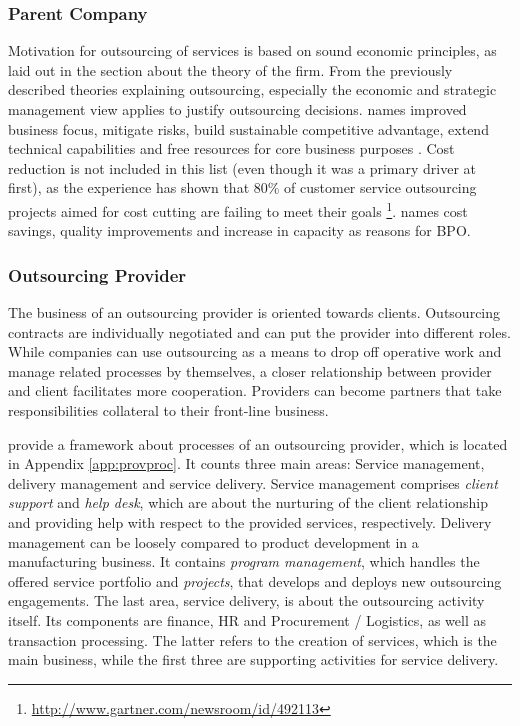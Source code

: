 		\subsubsection{Parent Company}
		Motivation for outsourcing of services is based on sound economic principles, as laid out in the section about the theory of the firm. From the previously described theories explaining outsourcing, especially the economic and strategic management view applies to justify outsourcing decisions. \citeauthor{bartell1998information} names improved business focus, mitigate risks, build sustainable competitive advantage, extend technical capabilities and free resources for core business purposes \citep{bartell1998information}. Cost reduction is not included in this list (even though it was a primary driver at first), as the experience has shown that 80\% of customer service outsourcing projects aimed for cost cutting are failing to meet their goals \footnote{\cf \url{http://www.gartner.com/newsroom/id/492113}}. \citeauthor{Gross2007} names cost savings, quality improvements and increase in capacity \citep[]{gross2007} as reasons for \acrshort{BPO}. 
	
		\subsubsection{Outsourcing Provider}
		
		The business of an outsourcing provider is oriented towards clients. Outsourcing contracts are individually negotiated and can put the provider into different roles. While companies can use outsourcing as a means to drop off operative work and manage related processes by themselves, a closer relationship between provider and client facilitates more cooperation. Providers can become partners that take responsibilities collateral to their front-line business. 
		
		\cite{schewe2007} provide a framework about processes of an outsourcing provider, which is located in Appendix \ref{app:provproc}. It counts three main areas: Service management, delivery management and service delivery. Service management comprises \textit{client support} and \textit{help desk}, which are about the nurturing of the client relationship and providing help with respect to the provided services, respectively. Delivery management can be loosely compared to product development in a manufacturing business. It contains \textit{program management}, which handles the offered service portfolio and \textit{projects}, that develops and deploys new outsourcing engagements. The last area, service delivery, is about the outsourcing activity itself. Its components are finance, HR and Procurement / Logistics, as well as transaction processing. The latter refers to the creation of services, which is the main business, while the first three are supporting activities for service delivery. 
			
